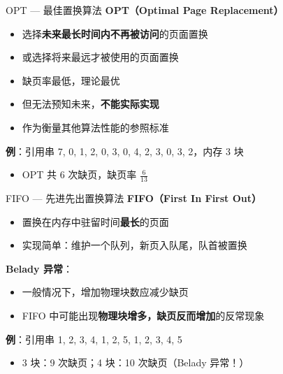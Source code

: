 \documentclass[10pt, aspectratio=169]{beamer}
\begin{document}
\begin{frame}{OPT --- 最佳置换算法}
    \textbf{OPT（Optimal Page Replacement）}
    \begin{itemize}
        \item 选择\textbf{未来最长时间内不再被访问}的页面置换
        \item 或选择将来最远才被使用的页面置换
        \item 缺页率最低，理论最优
        \item 但无法预知未来，\textbf{不能实际实现}
        \item 作为衡量其他算法性能的参照标准
    \end{itemize}
    \vspace{0.5em}
    \textbf{例}：引用串 7, 0, 1, 2, 0, 3, 0, 4, 2, 3, 0, 3, 2，内存 3 块
    \begin{itemize}
        \item OPT 共 6 次缺页，缺页率 $\frac{6}{13}$
    \end{itemize}
\end{frame}

\begin{frame}{FIFO --- 先进先出置换算法}
    \textbf{FIFO（First In First Out）}
    \begin{itemize}
        \item 置换在内存中驻留时间\textbf{最长}的页面
        \item 实现简单：维护一个队列，新页入队尾，队首被置换
    \end{itemize}
    \vspace{0.5em}
    \textbf{Belady 异常}：
    \begin{itemize}
        \item 一般情况下，增加物理块数应减少缺页
        \item FIFO 中可能出现\textbf{物理块增多，缺页反而增加}的反常现象
    \end{itemize}
    \vspace{0.5em}
    \textbf{例}：引用串 1, 2, 3, 4, 1, 2, 5, 1, 2, 3, 4, 5
    \begin{itemize}
        \item 3 块：9 次缺页；4 块：10 次缺页（Belady 异常！）
    \end{itemize}
\end{frame}
\end{document}
